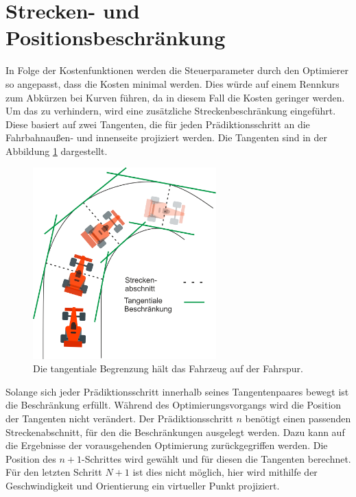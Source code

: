 \documentclass{like}
\begin{document}
\section{Strecken- und Positionsbeschränkung}
\label{trackAndPosConstraint}
In Folge der Kostenfunktionen werden die Steuerparameter durch den Optimierer so angepasst, dass die Kosten minimal werden. Dies würde auf einem Rennkurs zum Abkürzen bei Kurven führen, da in diesem Fall die Kosten geringer werden. Um das zu verhindern, wird eine zusätzliche Streckenbeschränkung eingeführt. Diese basiert auf zwei Tangenten, die für jeden Prädiktionsschritt an die Fahrbahnaußen- und innenseite projiziert werden. Die Tangenten sind in der Abbildung \ref{fig:tangentialConstraint} dargestellt.
\begin{figure}[ht!]
	\centering
	\includegraphics[width=200pt]{Abbildungen/tangentialConstraint.png}
	\caption{Die tangentiale Begrenzung hält das Fahrzeug auf der Fahrspur.}
	\label{fig:tangentialConstraint}
\end{figure}

Solange sich jeder Prädiktionsschritt innerhalb seines Tangentenpaares bewegt ist die Beschränkung erfüllt. Während des Optimierungsvorgangs wird die Position der Tangenten nicht verändert. Der Prädiktionsschritt \(n\) benötigt einen passenden Streckenabschnitt, für den die Beschränkungen ausgelegt werden. Dazu kann auf die Ergebnisse der vo\-raus\-ge\-henden Optimierung zurückgegriffen werden. Die Position des $n+1$-Schrittes wird gewählt und für diesen die Tangenten berechnet. Für den letzten Schritt \(N +1\) ist dies nicht möglich, hier wird mithilfe der Geschwindigkeit und Orientierung ein virtueller Punkt projiziert.   
\end{document}
